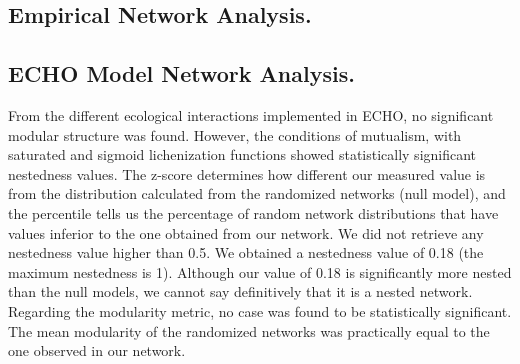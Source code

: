 
\subsection{Empirical Network Analysis. }

\subsection{ECHO Model Network Analysis. }

From the different ecological interactions implemented in ECHO, no significant modular structure was found. However, the conditions of mutualism, with saturated and sigmoid lichenization functions showed statistically significant nestedness values. The z-score determines how different our measured value is from the distribution calculated from the randomized networks (null model), and the percentile tells us the percentage of random network distributions that have values inferior to the one obtained from our network. We did not retrieve any nestedness value higher than 0.5. We obtained a nestedness value of 0.18 (the maximum nestedness is 1). Although our value of 0.18 is significantly more nested than the null models, we cannot say definitively that it is a nested network. Regarding the modularity metric, no case was found to be statistically significant. The mean modularity of the randomized networks was practically equal to the one observed in our network. 


